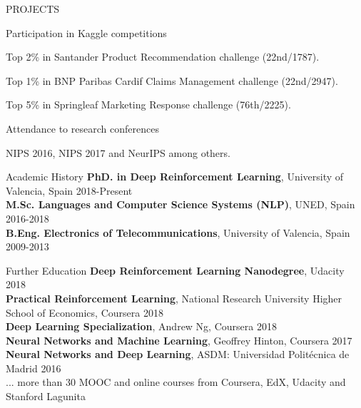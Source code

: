 \documentclass{resume} %
\begin{document}
\begin{rSection}{PROJECTS}
\vspace{-6pt}

\begin{rSubsection}{Participation in Kaggle competitions}
{}{}{}  

\vspace{-3pt}

\item Top 2\% in Santander Product Recommendation challenge (22nd/1787).
\item Top 1\% in BNP Paribas Cardif Claims Management challenge (22nd/2947).
\item Top 5\% in Springleaf Marketing Response challenge (76th/2225).

\end{rSubsection}

\vspace{-6pt}

\begin{rSubsection}{Attendance to research conferences}{}{}{}  

\vspace{-3pt}

 \item NIPS 2016, NIPS 2017 and NeurIPS  among others.

\end{rSubsection}

\end{rSection} 



\begin{rSection}{Academic History}
{\textbf{PhD. in Deep Reinforcement Learning}, University of Valencia, Spain} \hfill {2018-Present}
\\
{\textbf{M.Sc. Languages and Computer Science Systems (NLP)}, UNED, Spain} \hfill {2016-2018}
\\
{\textbf{B.Eng. Electronics of Telecommunications}, University of Valencia, Spain} \hfill {2009-2013}
\end{rSection}

\begin{rSection}{Further Education}
{\textbf{Deep Reinforcement Learning Nanodegree}, Udacity} \hfill {2018}\\
{\textbf{Practical Reinforcement Learning}, National Research University Higher School of Economics, Coursera} \hfill {2018}\\
{\textbf{Deep Learning Specialization}, Andrew Ng, Coursera} \hfill {2018}\\
{\textbf{Neural Networks and Machine Learning}, Geoffrey Hinton, Coursera \hfill {2017}}\\
{\textbf{Neural Networks and Deep Learning}, ASDM: Universidad Politécnica de Madrid \hfill {2016}}\\
{... more than 30 MOOC and online courses from Coursera, EdX, Udacity and Stanford Lagunita}
\end{rSection}
\end{document}
